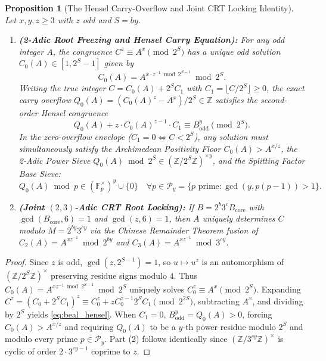 \documentclass[11pt, a4paper]{amsart}
\newtheorem{proposition}[theorem]{Proposition}
\theoremstyle{definition}
\newcommand{\Z}{\mathbb{Z}}
\newcommand{\F}{\mathbb{F}}
\newcommand{\Py}{\mathcal{P}_y}
\begin{document}
\begin{proposition}[The Hensel Carry-Overflow and Joint CRT Locking Identity]\label{prop:beal_hensel}
Let $x, y, z \ge 3$ with $z$ odd and $S = by$.
\begin{enumerate}
    \item \textbf{(2-Adic Root Freezing and Hensel Carry Equation):} For any odd integer $A$, the congruence $C^z \equiv A^x \pmod{2^S}$ has a unique odd solution $C_0(A) \in [1, 2^S - 1]$ given by
    \begin{equation}
    C_0(A) = A^{x \cdot z^{-1} \bmod 2^{S-1}} \bmod 2^S.
    \end{equation}
    Writing the true integer $C = C_0(A) + 2^S C_1$ with $C_1 = \lfloor C / 2^S \rfloor \ge 0$, the exact carry overflow $Q_0(A) = (C_0(A)^z - A^x) / 2^S \in \Z$ satisfies the second-order Hensel congruence
    \begin{equation}\label{eq:beal_hensel}
    Q_0(A) + z \cdot C_0(A)^{z-1} \cdot C_1 \equiv B_{\text{odd}}^y \pmod{2^S}.
    \end{equation}
    In the zero-overflow envelope ($C_1 = 0 \iff C < 2^S$), any solution must simultaneously satisfy the \emph{Archimedean Positivity Floor} $C_0(A) > A^{x/z}$, the \emph{2-Adic Power Sieve} $Q_0(A) \bmod 2^S \in (\Z/2^S\Z)^{\times y}$, and the \emph{Splitting Factor Base Sieve}:
    \begin{equation}\label{eq:beal_sieve}
    Q_0(A) \bmod p \in (\F_p^\times)^y \cup \{0\} \quad \forall p \in \Py = \{ p \text{ prime} : \gcd(y, p(p-1)) > 1 \}.
    \end{equation}
    \item \textbf{(Joint $(2,3)$-Adic CRT Root Locking):} If $B = 2^b 3^c B_{\text{core}}$ with $\gcd(B_{\text{core}}, 6) = 1$ and $\gcd(z, 6) = 1$, then $A$ uniquely determines $C$ modulo $M = 2^{by} 3^{cy}$ via the Chinese Remainder Theorem fusion of $C_2(A) = A^{x z^{-1}} \bmod 2^{by}$ and $C_3(A) = A^{x z^{-1}} \bmod 3^{cy}$.
\end{enumerate}
\end{proposition}

\begin{proof}
Since $z$ is odd, $\gcd(z, 2^{S-1}) = 1$, so $u \mapsto u^z$ is an automorphism of $(\Z/2^S\Z)^\times$ preserving residue signs modulo $4$. Thus $C_0(A) = A^{x z^{-1} \bmod 2^{S-1}} \bmod 2^S$ uniquely solves $C_0^z \equiv A^x \pmod{2^S}$. Expanding $C^z = (C_0 + 2^S C_1)^z \equiv C_0^z + z C_0^{z-1} 2^S C_1 \pmod{2^{2S}}$, subtracting $A^x$, and dividing by $2^S$ yields \eqref{eq:beal_hensel}. When $C_1 = 0$, $B_{\text{odd}}^y = Q_0(A) > 0$, forcing $C_0(A) > A^{x/z}$ and requiring $Q_0(A)$ to be a $y$-th power residue modulo $2^S$ and modulo every prime $p \in \Py$. Part (2) follows identically since $(\Z/3^{cy}\Z)^\times$ is cyclic of order $2 \cdot 3^{cy-1}$ coprime to $z$.
\end{proof}
\end{document}
